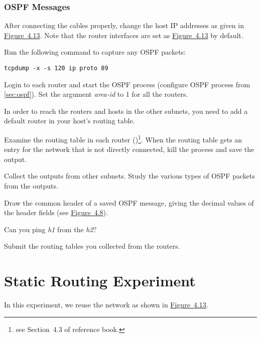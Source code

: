 \documentclass{../UTNetLab}
\begin{document}
\section{OSPF Messages}
After connecting the cables properly, change the host IP addresses as given in \hyperref[fig:4.13]{Figure~4.13}.
Note that the router interfaces are set as \hyperref[fig:4.13]{Figure~4.13} by default.

Run the following command to capture any OSPF packets:
\begin{lstlisting}[morekeywords={[3]ip,proto}]
tcpdump -x -s 120 ip proto 89
    \end{lstlisting}

Login to each router and start the OSPF process (configure OSPF process from \autoref{sec:ospf}).
Set the argument \textit{area-id} to 1 for all the routers.

In order to reach the routers and hosts in the other subnets, you need to add a default router in your host’s routing table.

Examine the routing table in each router ()\footnote{see Section~4.3 of reference book.}.
When the routing table gets an entry for the network that is not directly connected, kill the  process and save the  output.

Collect the  outputs from other subnets.
Study the various types of OSPF packets from the  outputs.

\begin{report}
    \item Draw the common header of a saved OSPF message, giving the decimal values of the header fields (see \hyperref[fig:4.8]{Figure~4.8}).

    \item Can you ping \textit{h1} from the \textit{h2}?

    \item Submit the routing tables you collected from the routers.
\end{report}

\part{Static Routing Experiment}\label{sec:static}
In this experiment, we reuse the network as shown in \hyperref[fig:4.13]{Figure~4.13}.
\end{document}
